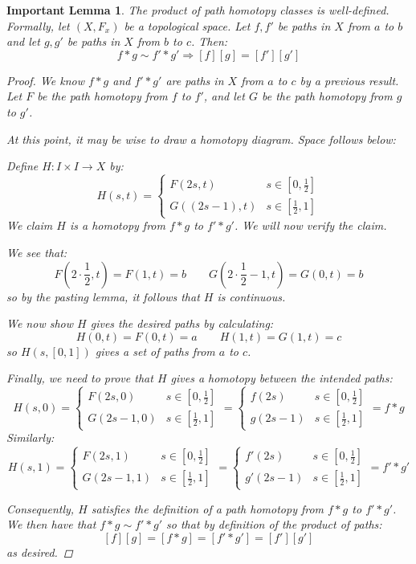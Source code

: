 \documentclass[reqno]{amsart}
\newcommand{\half}[1]{\frac{#1}{2}}
\newtheorem{implemma}[theorem]{Important Lemma}
\begin{document}
\begin{implemma}
The product of path homotopy classes is well-defined. Formally, let $(X,F_x)$ be a topological space. Let $f,f'$ be paths in $X$ from $a$ to $b$ and let $g,g'$ be paths in $X$ from $b$ to $c$. Then:
\[f*g \sim f'*g' \Rightarrow [f][g] = [f'][g']\]

\begin{proof}
We know $f*g$ and $f'*g'$ are paths in $X$ from $a$ to $c$ by a previous result. 
Let $F$ be the path homotopy from $f$ to $f'$, and let $G$ be the path homotopy from $g$ to $g'$.

At this point, it may be wise to draw a homotopy diagram. Space follows below: 
\vspace{2.5in}

Define $H:I\times I\to X$ by:
\[H(s,t) = \begin{cases} F(2s,t) & s\in [0,\half1] \\ G((2s-1),t) & s\in [\half1,1] \end{cases}\]
We claim $H$ is a homotopy from $f*g$ to $f'*g'$. We will now verify the claim. 

We see that:
\[F(2\cdot\half1,t) = F(1,t) = b \qquad G(2\cdot\half1 -1,t) = G(0,t) = b\]
so by the pasting lemma, it follows that $H$ is continuous.

We now show $H$ gives the desired paths by calculating:
\[H(0,t) = F(0,t) = a \qquad H(1,t) = G(1,t) = c\]
so $H(s,[0,1])$ gives a set of paths from $a$ to $c$. 

Finally, we need to prove that $H$ gives a homotopy between the intended paths:
\[H(s,0) = \begin{cases}F(2s,0) & s\in [0,\half1] \\ G(2s-1,0) & s\in [\half1,1]  \end{cases} = \begin{cases} f(2s) & s\in [0,\half1] \\ g(2s-1) & s\in [\half1,1] \end{cases}= f*g \]
Similarly:
\[H(s,1) = \begin{cases}F(2s,1) & s\in [0,\half1] \\ G(2s-1,1) & s\in [\half1,1]  \end{cases} = \begin{cases} f'(2s) & s\in [0,\half1] \\ g'(2s-1) & s\in [\half1,1] \end{cases}= f'*g'  \]

Consequently, $H$ satisfies the definition of a path homotopy from $f*g$ to $f'*g'$. We then have that $f*g\sim f'*g'$ so that by definition of the product of paths:
\[[f][g] = [f*g] = [f'*g'] = [f'][g']\]
as desired.
\end{proof}
\end{implemma}
\end{document}
